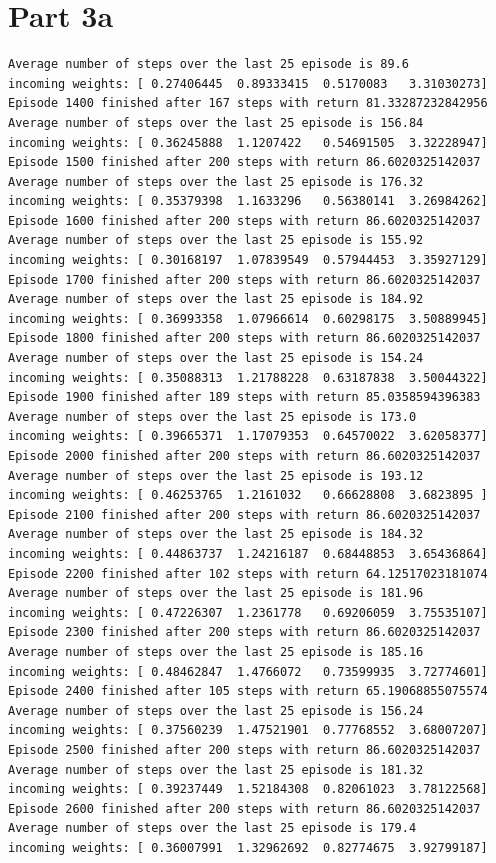 \documentclass{article}
\newcommand{\enterProblemHeader}[1]{
}
\newcommand{\exitProblemHeader}[1]{
}
\newcounter{homeworkProblemCounter} %
\newcommand{\homeworkProblemName}{}
\newenvironment{homeworkProblem}[1][Part \arabic{homeworkProblemCounter}]{ %
\stepcounter{homeworkProblemCounter} %
\renewcommand{\homeworkProblemName}{#1} %
\section{\homeworkProblemName} %
\enterProblemHeader{\homeworkProblemName} %
}{
\exitProblemHeader{\homeworkProblemName} %
}
\begin{document}
\begin{homeworkProblem}[Part 3a]
\begin{verbatim}
Average number of steps over the last 25 episode is 89.6
incoming weights: [ 0.27406445  0.89333415  0.5170083   3.31030273]
Episode 1400 finished after 167 steps with return 81.33287232842956
Average number of steps over the last 25 episode is 156.84
incoming weights: [ 0.36245888  1.1207422   0.54691505  3.32228947]
Episode 1500 finished after 200 steps with return 86.6020325142037
Average number of steps over the last 25 episode is 176.32
incoming weights: [ 0.35379398  1.1633296   0.56380141  3.26984262]
Episode 1600 finished after 200 steps with return 86.6020325142037
Average number of steps over the last 25 episode is 155.92
incoming weights: [ 0.30168197  1.07839549  0.57944453  3.35927129]
Episode 1700 finished after 200 steps with return 86.6020325142037
Average number of steps over the last 25 episode is 184.92
incoming weights: [ 0.36993358  1.07966614  0.60298175  3.50889945]
Episode 1800 finished after 200 steps with return 86.6020325142037
Average number of steps over the last 25 episode is 154.24
incoming weights: [ 0.35088313  1.21788228  0.63187838  3.50044322]
Episode 1900 finished after 189 steps with return 85.0358594396383
Average number of steps over the last 25 episode is 173.0
incoming weights: [ 0.39665371  1.17079353  0.64570022  3.62058377]
Episode 2000 finished after 200 steps with return 86.6020325142037
Average number of steps over the last 25 episode is 193.12
incoming weights: [ 0.46253765  1.2161032   0.66628808  3.6823895 ]
Episode 2100 finished after 200 steps with return 86.6020325142037
Average number of steps over the last 25 episode is 184.32
incoming weights: [ 0.44863737  1.24216187  0.68448853  3.65436864]
Episode 2200 finished after 102 steps with return 64.12517023181074
Average number of steps over the last 25 episode is 181.96
incoming weights: [ 0.47226307  1.2361778   0.69206059  3.75535107]
Episode 2300 finished after 200 steps with return 86.6020325142037
Average number of steps over the last 25 episode is 185.16
incoming weights: [ 0.48462847  1.4766072   0.73599935  3.72774601]
Episode 2400 finished after 105 steps with return 65.19068855075574
Average number of steps over the last 25 episode is 156.24
incoming weights: [ 0.37560239  1.47521901  0.77768552  3.68007207]
Episode 2500 finished after 200 steps with return 86.6020325142037
Average number of steps over the last 25 episode is 181.32
incoming weights: [ 0.39237449  1.52184308  0.82061023  3.78122568]
Episode 2600 finished after 200 steps with return 86.6020325142037
Average number of steps over the last 25 episode is 179.4
incoming weights: [ 0.36007991  1.32962692  0.82774675  3.92799187]

\end{verbatim}
\end{homeworkProblem}
\end{document}
